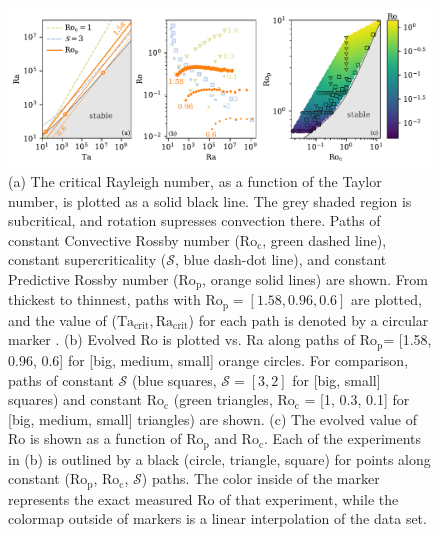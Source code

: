 \documentclass[twocolumn, amsmath, amsfonts, amssymb, trackchanges]{aastex62}
\newcommand{\pro}{\ensuremath{\text{Ro}_{\text{p}}}}
\newcommand{\con}{\ensuremath{\text{Ro}_{\text{c}}}}
\begin{document}
\begin{figure}[t!]
    \includegraphics[width=\textwidth]{parameter_space.pdf}
    \caption{(a) The critical Rayleigh number, as a function of the Taylor number, 
    is plotted as a solid black line. The grey shaded region is subcritical, and rotation
    supresses convection there. Paths of constant Convective Rossby number
    ($\con$, green dashed line), constant supercriticality ($\mathcal{S}$, blue dash-dot line), and 
    constant Predictive Rossby number (\pro, orange solid lines) are shown. 
	From thickest to thinnest, paths with $\pro = [1.58, 0.96, 0.6]$ are plotted,
	and the value of
	($\text{Ta}_{\text{crit}}, \text{Ra}_{\text{crit}}$) for each path is denoted by a
	circular marker .
    (b) Evolved Ro is plotted vs. Ra along paths of \pro = [1.58, 0.96, 0.6] for [big, medium, small] orange circles.
    For comparison, paths of constant $\mathcal{S}$ (blue squares, $\mathcal{S} = [3,2]$ 
    for [big, small] squares)
    and constant $\con$ (green triangles, $\con$ = [1, 0.3, 0.1] for [big, medium, small] triangles) are shown.
    (c) The evolved value of Ro is shown as a function of $\pro$ and $\con$. 
	Each of the experiments in (b) is outlined by a black (circle, triangle, square)
	for points along constant (\pro, \con, $\mathcal{S}$) paths.
	The color inside of the marker represents the exact measured Ro of that experiment, 
	while the colormap outside of markers is a linear interpolation
	of the data set. 
    \label{fig:parameter_space} }
\end{figure}
\end{document}
